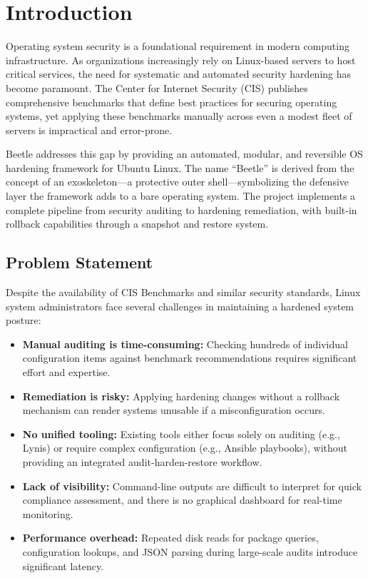 \pagebreak
\section{Introduction}

Operating system security is a foundational requirement in modern computing infrastructure. As organizations increasingly rely on Linux-based servers to host critical services, the need for systematic and automated security hardening has become paramount. The Center for Internet Security (CIS) publishes comprehensive benchmarks that define best practices for securing operating systems, yet applying these benchmarks manually across even a modest fleet of servers is impractical and error-prone.

Beetle addresses this gap by providing an automated, modular, and reversible OS hardening framework for Ubuntu Linux. The name ``Beetle'' is derived from the concept of an exoskeleton---a protective outer shell---symbolizing the defensive layer the framework adds to a bare operating system. The project implements a complete pipeline from security auditing to hardening remediation, with built-in rollback capabilities through a snapshot and restore system.

\subsection{Problem Statement}

Despite the availability of CIS Benchmarks and similar security standards, Linux system administrators face several challenges in maintaining a hardened system posture:

\begin{itemize}[noitemsep]
    \item \textbf{Manual auditing is time-consuming:} Checking hundreds of individual configuration items against benchmark recommendations requires significant effort and expertise.
    \item \textbf{Remediation is risky:} Applying hardening changes without a rollback mechanism can render systems unusable if a misconfiguration occurs.
    \item \textbf{No unified tooling:} Existing tools either focus solely on auditing (e.g., Lynis) or require complex configuration (e.g., Ansible playbooks), without providing an integrated audit-harden-restore workflow.
    \item \textbf{Lack of visibility:} Command-line outputs are difficult to interpret for quick compliance assessment, and there is no graphical dashboard for real-time monitoring.
    \item \textbf{Performance overhead:} Repeated disk reads for package queries, configuration lookups, and JSON parsing during large-scale audits introduce significant latency.
\end{itemize}


